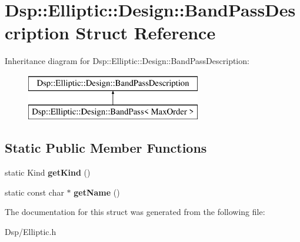\hypertarget{structDsp_1_1Elliptic_1_1Design_1_1BandPassDescription}{\section{Dsp\-:\-:Elliptic\-:\-:Design\-:\-:Band\-Pass\-Description Struct Reference}
\label{structDsp_1_1Elliptic_1_1Design_1_1BandPassDescription}
}
Inheritance diagram for Dsp\-:\-:Elliptic\-:\-:Design\-:\-:Band\-Pass\-Description\-:\begin{figure}[H]
\begin{center}
\leavevmode
\includegraphics[height=2.000000cm]{structDsp_1_1Elliptic_1_1Design_1_1BandPassDescription}
\end{center}
\end{figure}
\subsection*{Static Public Member Functions}
\begin{DoxyCompactItemize}
\item 
\hypertarget{structDsp_1_1Elliptic_1_1Design_1_1BandPassDescription_a6a06fca7a7860a11d784511fc5acec41}{static Kind {\bfseries get\-Kind} ()}\label{structDsp_1_1Elliptic_1_1Design_1_1BandPassDescription_a6a06fca7a7860a11d784511fc5acec41}

\item 
\hypertarget{structDsp_1_1Elliptic_1_1Design_1_1BandPassDescription_a7361ffe14e9a9c45cd221ba19a199a2c}{static const char $\ast$ {\bfseries get\-Name} ()}\label{structDsp_1_1Elliptic_1_1Design_1_1BandPassDescription_a7361ffe14e9a9c45cd221ba19a199a2c}

\end{DoxyCompactItemize}


The documentation for this struct was generated from the following file\-:\begin{DoxyCompactItemize}
\item 
Dsp/Elliptic.\-h\end{DoxyCompactItemize}
